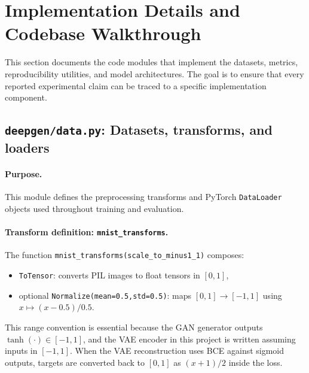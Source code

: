 
\section{Implementation Details and Codebase Walkthrough}
This section documents the code modules that implement the datasets, metrics, reproducibility utilities, and model architectures. The goal is to ensure that every reported experimental claim can be traced to a specific implementation component.

\subsection{\texttt{deepgen/data.py}: Datasets, transforms, and loaders}
\paragraph{Purpose.}
This module defines the preprocessing transforms and PyTorch \texttt{DataLoader} objects used throughout training and evaluation.

\paragraph{Transform definition: \texttt{mnist\_transforms}.}
The function \texttt{mnist\_transforms(scale\_to\_minus1\_1)} composes:
\begin{itemize}
  \item \texttt{ToTensor}: converts PIL images to float tensors in $[0,1]$,
  \item optional \texttt{Normalize(mean=0.5,std=0.5)}: maps $[0,1]\rightarrow[-1,1]$ using $x\mapsto (x-0.5)/0.5$.
\end{itemize}
This range convention is essential because the GAN generator outputs $\tanh(\cdot)\in[-1,1]$, and the VAE encoder in this project is written assuming inputs in $[-1,1]$. When the VAE reconstruction uses BCE against sigmoid outputs, targets are converted back to $[0,1]$ as $(x+1)/2$ inside the loss.

